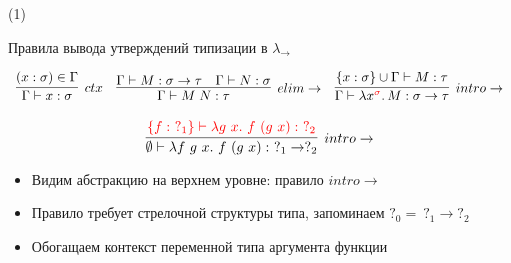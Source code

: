     \begin{frame}[t, noframenumbering]{\btypename (1)}
        \begin{block}{Правила вывода утверждений типизации в $\lambda_{\rightarrow}$}
            \vspace{-1em}
            \begin{center}
                \[
                    \begin{array}{l c r}
                        \infer[ctx]{\Gamma \vdash x: \sigma}{(x: \sigma) \in \Gamma}
                        &
                        \infer[elim\to]{\Gamma \vdash M\;N : \tau}{\Gamma \vdash M : \sigma \to \tau & \Gamma \vdash N : \sigma}
                        &
                        \infer[intro\to]{\Gamma \vdash \lambda x^{\color{red} \sigma}\ldotp M : \sigma \to \tau}{\{x : \sigma\} \cup \Gamma \vdash M : \tau}
                    \end{array}
                \]
            \end{center}
        \end{block}
        \[
            \infer[intro\to]{\emptyset \vdash \lambda f~g~x.~f~(g~x) :~ ?_1 \to ?_2}
            {\color{red}\{f :~ ?_1\} \vdash \lambda g~x.~f~(g~x) :~ ?_2}
        \]
        \vspace{-1em}
        \begin{itemize}
            \item Видим абстракцию на верхнем уровне: правило $intro\to$
            \item Правило требует стрелочной структуры типа, запоминаем $?_0 =~ ?_1\to ?_2$
            \item Обогащаем контекст переменной типа аргумента функции
        \end{itemize}
    \end{frame}

